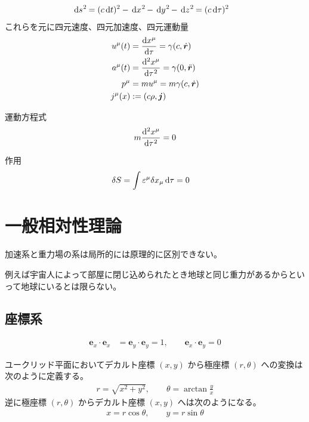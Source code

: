 \documentclass[uplatex,dvipdfmx,a4paper,11pt]{jlreq}
\newcommand{\ee}{\bm{e}}
\newcommand{\rr}{\bm{r}}
\theoremstyle{definition}
\begin{document}
\begin{definition}[世界間隔]
  \begin{align}
    \dl{s}^2 & = (c\dl{t})^2 - \dl{x}^2 - \dl{y}^2 - \dl{z}^2 = (c\dl{\tau})^2
  \end{align}
  これらを元に四元速度、四元加速度、四元運動量
  \begin{align}
    u^\mu(t) & = \diff{x^\mu}{\tau} = \gamma(c, \dot{\rr})     \\
    a^\mu(t) & = \diff[2]{x^\mu}{\tau} = \gamma(0, \ddot{\rr}) \\
    p^\mu    & = mu^\mu = m\gamma(c, \dot{\rr})                \\
    j^\mu(x) & := (c\rho, \bm{j})                              \\
  \end{align}
\end{definition}

運動方程式
\begin{align}
  m\diff[2]{x^\mu}{\tau} = 0
\end{align}

作用
\begin{align}
  \delta S & = \int \varepsilon^\mu\delta x_\mu\dl{\tau} = 0
\end{align}

\section{一般相対性理論}
\begin{axiom}[アインシュタインの等価原理]
  加速系と重力場の系は局所的には原理的に区別できない。
\end{axiom}
例えば宇宙人によって部屋に閉じ込められたとき地球と同じ重力があるからといって地球にいるとは限らない。

\subsection{座標系}
\begin{definition}[デカルト座標]
  \begin{align}
    \ee_x\cdot\ee_x & = \ee_y\cdot\ee_y = 1, \qquad \ee_x\cdot\ee_y = 0
  \end{align}
\end{definition}

\begin{definition}[極座標]
  ユークリッド平面においてデカルト座標 $(x, y)$ から極座標 $(r, \theta)$ への変換は次のように定義する。
  \begin{align}
    r = \sqrt{x^2 + y^2}, \qquad \theta = \arctan\frac{y}{x}
  \end{align}
  逆に極座標 $(r, \theta)$ からデカルト座標 $(x, y)$ へは次のようになる。
  \begin{align}
    x = r\cos\theta, \qquad y = r\sin\theta
  \end{align}
\end{definition}
\end{document}
